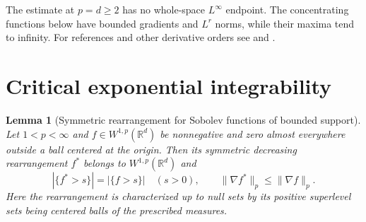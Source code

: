 \documentclass[11pt,oneside,openany]{book}
\newtheorem{lemma}[theorem]{Lemma}
\theoremstyle{definition}
\theoremstyle{remark}
\begin{document}
The estimate at \(p=d\ge2\) has no whole-space \(L^\infty\) endpoint.
The concentrating functions below have bounded gradients and \(L^r\)
norms, while their maxima tend to infinity. For references and other
derivative orders see \cite[Sections 12.5 and 13.3]{leoni}
and \cite[Chapter 5]{adams}.

\section{Critical exponential integrability}

\begin{lemma}[Symmetric rearrangement for Sobolev functions of bounded support]
\label{p102:u5-polya-szego}
Let \(1<p<\infty\) and \(f\in W^{1,p}(\mathbb R^d)\) be nonnegative
and zero almost everywhere outside a ball centered at the origin.
Then its symmetric decreasing rearrangement \(f^\ast\) belongs to
\(W^{1,p}(\mathbb R^d)\) and
\[
 |\{f^\ast>s\}|=|\{f>s\}|\quad(s>0),\qquad
 \|\nabla f^\ast\|_p\le\|\nabla f\|_p .
\]
Here the rearrangement is characterized up to null sets by its positive
superlevel sets being centered balls of the prescribed measures.
\end{lemma}
\end{document}
